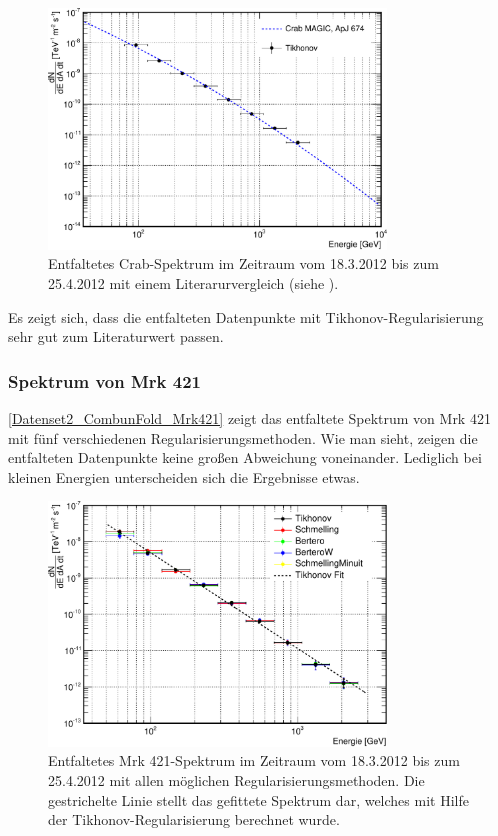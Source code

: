 \begin{figure}
    \centering
    \includegraphics[width=0.8\textwidth]{./Plots/04_MrkAnalyse/Datenset2/Crab_mit_Literatur.pdf}
    \caption{Entfaltetes Crab-Spektrum im Zeitraum vom 18.3.2012 bis zum 25.4.2012 mit einem Literarurvergleich (siehe \cite{LiteraturreferenzMAGIC}).}
    \label{Datenset2_CombunFold_Crab}
\end{figure}

Es zeigt sich, dass die entfalteten Datenpunkte mit Tikhonov-Regularisierung sehr gut zum Literaturwert passen.

\subsubsection{Spektrum von Mrk 421}
\autoref{Datenset2_CombunFold_Mrk421} zeigt das entfaltete Spektrum von Mrk 421 mit fünf verschiedenen Regularisierungsmethoden.
Wie man sieht, zeigen die entfalteten Datenpunkte keine großen Abweichung voneinander. 
Lediglich bei kleinen Energien unterscheiden sich die Ergebnisse etwas.

\begin{figure}
    \centering
    \includegraphics[width=0.8\textwidth]{./Plots/04_MrkAnalyse/Datenset2/Spektrum_Mrk421.pdf}
    \caption{Entfaltetes Mrk 421-Spektrum im Zeitraum vom 18.3.2012 bis zum 25.4.2012 mit allen möglichen Regularisierungsmethoden.
    Die gestrichelte Linie stellt das gefittete Spektrum dar, welches mit Hilfe der Tikhonov-Regularisierung berechnet wurde.}
    \label{Datenset2_CombunFold_Mrk421}
\end{figure}

